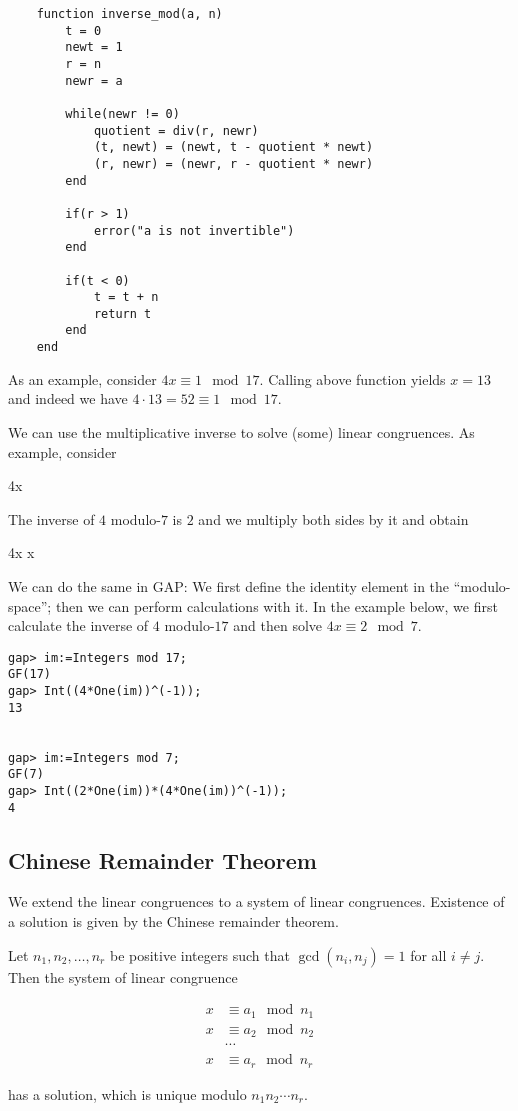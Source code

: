 \begin{verbatim}
    function inverse_mod(a, n)
        t = 0
        newt = 1
        r = n
        newr = a

        while(newr != 0)
            quotient = div(r, newr)
            (t, newt) = (newt, t - quotient * newt) 
            (r, newr) = (newr, r - quotient * newr)
        end

        if(r > 1)
            error("a is not invertible")
        end

        if(t < 0)
            t = t + n
            return t
        end
    end
\end{verbatim}

As an example, consider $4x \equiv 1 \mod 17$. Calling above function yields $x = 13$ and indeed we have $4 \cdot 13 = 52 \equiv 1 \mod 17$.

We can use the multiplicative inverse to solve (some) linear congruences. As example, consider

\bee
4x  
\eee

The inverse of $4$ modulo-$7$ is $2$ and we multiply both sides by it and obtain

 \cdot 4x    \rightarrow x  
\eee

We can do the same in GAP: We first define the identity element in the ``modulo-space''; then we can perform calculations with it. In the example below, we first calculate the inverse of $4$ modulo-$17$ and then solve $4x \equiv 2 \mod 7$. 

\begin{verbatim}
gap> im:=Integers mod 17;
GF(17)
gap> Int((4*One(im))^(-1));
13


gap> im:=Integers mod 7;
GF(7)
gap> Int((2*One(im))*(4*One(im))^(-1));
4
\end{verbatim}



\subsection{Chinese Remainder Theorem}

We extend the linear congruences to a system of linear congruences. Existence of a solution is given by the Chinese remainder theorem.

\begin{theorem}
    Let $n_1, n_2, \ldots, n_r$ be positive integers such that $\gcd(n_i, n_j) = 1$ for all $i \neq j$. Then the system of linear congruence

    \begin{align*}
        x &\equiv a_1 \mod n_1 \\
        x &\equiv a_2 \mod n_2 \\
        & \cdots \\
        x &\equiv a_r \mod n_r
    \end{align*}

    has a solution, which is unique modulo $n_1 n_2 \cdots n_r$.
\end{theorem}

